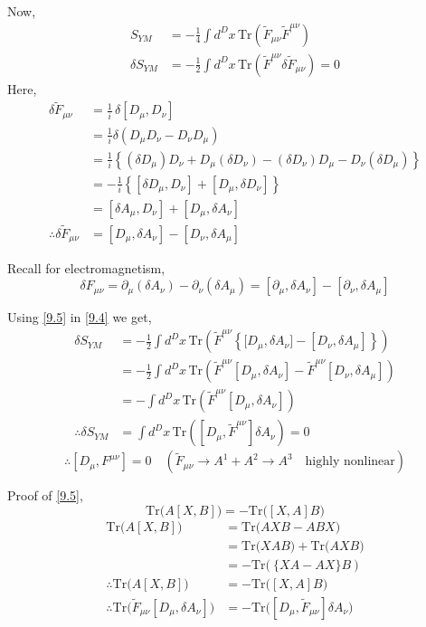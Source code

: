 \documentclass[14pt]{article} %
\begin{document}
Now,
\begin{align*}
S_{YM} &= -\frac{1}{4} \int d^D x \, \mathrm{Tr}\left( \tilde{F}_{\mu \nu} \tilde{F}^{\mu \nu} \right) \\
\delta S_{YM} &= -\frac{1}{2} \int d^D x \, \mathrm{Tr}\left( \tilde{F}^{\mu \nu} \delta \tilde{F}_{\mu \nu} \right) =0 \tag{9.4} \label{9.4}
\end{align*}
Here,
\begin{align*}
\delta \tilde{F}_{\mu \nu} &= \frac{1}{i}\, \delta [D_\mu, D_\nu] \\
&= \frac{1}{i} \delta (D_\mu D_\nu - D_\nu D_\mu) \\
&= \frac{1}{i} \left\{ (\delta D_\mu) D_\nu + D_\mu (\delta D_\nu) - (\delta D_\nu) D_\mu - D_\nu (\delta D_\mu) \right\} \\
&= -\frac{1}{i} \left\{ [\delta D_\mu, D_\nu] + [D_\mu, \delta D_\nu] \right\} \\
&=[\delta A_\mu, D_\nu] + [D_\mu, \delta A_\nu] \\
\therefore \delta \tilde{F}_{\mu \nu} &= [D_\mu, \delta A_\nu] - [D_\nu, \delta A_\mu] \tag{9.5} \label{9.5}
\end{align*}
\begin{tcolorbox}
Recall for electromagnetism,
\[
\delta F_{\mu \nu} = \partial_\mu (\delta A_\nu )-\partial_\nu (\delta A_\mu) = [\partial_\mu , \delta A_\nu ] - [\partial_\nu , \delta A_\mu]
\]
\end{tcolorbox}
Using \eqref{9.5} in \eqref{9.4} we get,
\begin{align*}
\delta S_{YM} &= -\frac{1}{2} \int d^D x \, \mathrm{Tr}\left( \tilde{F}^{\mu \nu}\left\{ \big[ D_\mu, \delta A_\nu \big] - \left[ D_\nu, \delta A_\mu \right] \right\}\right) \\
&= -\frac{1}{2} \int d^D x \, \mathrm{Tr}\left( \tilde{F}^{\mu \nu}\left[ D_\mu, \delta A_\nu \right] - \tilde{F}^{\mu \nu}\left[ D_\nu, \delta A_\mu \right] \right) \\
&=- \int d^D x \, \mathrm{Tr}\left( \tilde{F}^{\mu \nu}\left[ D_\mu, \delta A_\nu \right]\right) \\
\therefore \delta S_{YM}&= \int d^D x \, \mathrm{Tr}\left( \left[ D_\mu, \tilde{F}^{\mu \nu}\right] \delta A_\nu \right) = 0
\end{align*}
\[
\therefore \left[ D_\mu, F^{\mu \nu}\right]=0 \quad (\tilde{F}_{\mu \nu} \to A^1 + A^2 \to A^3 \quad \text{highly nonlinear})
\]
\begin{tcolorbox}
Proof of \eqref{9.5},
\[
\mathrm{Tr}\big( A[X,B] \big) = - \mathrm{Tr}\big([X,A]B \big)  
\]
\begin{align*}
\mathrm{Tr}\big( A[X,B] \big) &= \mathrm{Tr}\big( AXB - ABX \big) \\
&= \mathrm{Tr}\big( XAB \big) + \mathrm{Tr}\big( AXB \big) \\
&= -\mathrm{Tr}\big( ~\{XA-AX\} B ~\big) \\
\therefore \mathrm{Tr}\big( A[X,B] \big)&= - \mathrm{Tr}\big( [X,A]B \big) \\
\therefore \mathrm{Tr}\big( \tilde{F}_{\mu \nu}[D_\mu,\delta A_\nu] \big)&= - \mathrm{Tr}\big( [D_\mu,\tilde{F}_{\mu \nu}] \delta A_\nu \big)
\end{align*}
\end{tcolorbox}
\end{document}
